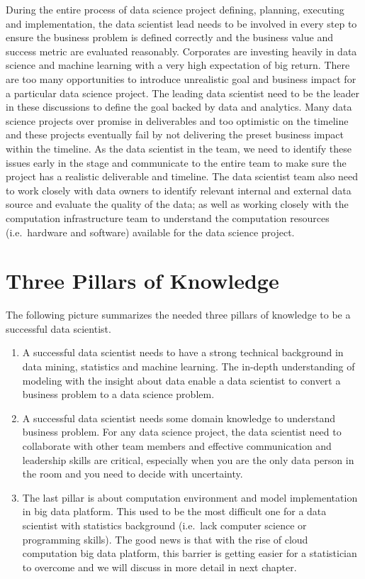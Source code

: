 \documentclass[12pt,]{krantz}
\theoremstyle{definition}
\theoremstyle{definition}
\theoremstyle{remark}
\begin{document}
During the entire process of data science project defining, planning,
executing and implementation, the data scientist lead needs to be
involved in every step to ensure the business problem is defined
correctly and the business value and success metric are evaluated
reasonably. Corporates are investing heavily in data science and machine
learning with a very high expectation of big return. There are too many
opportunities to introduce unrealistic goal and business impact for a
particular data science project. The leading data scientist need to be
the leader in these discussions to define the goal backed by data and
analytics. Many data science projects over promise in deliverables and
too optimistic on the timeline and these projects eventually fail by not
delivering the preset business impact within the timeline. As the data
scientist in the team, we need to identify these issues early in the
stage and communicate to the entire team to make sure the project has a
realistic deliverable and timeline. The data scientist team also need to
work closely with data owners to identify relevant internal and external
data source and evaluate the quality of the data; as well as working
closely with the computation infrastructure team to understand the
computation resources (i.e.~hardware and software) available for the
data science project.

\section{Three Pillars of Knowledge}\label{three-pillars-of-knowledge}

The following picture summarizes the needed three pillars of knowledge
to be a successful data scientist.

\begin{enumerate}
\def\labelenumi{(\arabic{enumi})}
\item
  A successful data scientist needs to have a strong technical
  background in data mining, statistics and machine learning. The
  in-depth understanding of modeling with the insight about data enable
  a data scientist to convert a business problem to a data science
  problem.
\item
  A successful data scientist needs some domain knowledge to understand
  business problem. For any data science project, the data scientist
  need to collaborate with other team members and effective
  communication and leadership skills are critical, especially when you
  are the only data person in the room and you need to decide with
  uncertainty.
\item
  The last pillar is about computation environment and model
  implementation in big data platform. This used to be the most
  difficult one for a data scientist with statistics background
  (i.e.~lack computer science or programming skills). The good news is
  that with the rise of cloud computation big data platform, this
  barrier is getting easier for a statistician to overcome and we will
  discuss in more detail in next chapter.
\end{enumerate}
\end{document}
